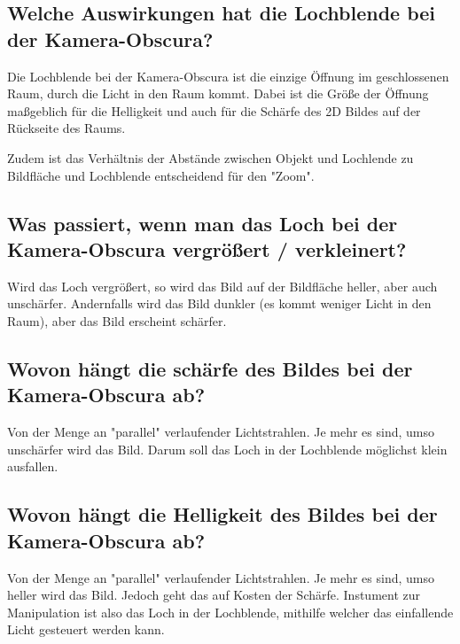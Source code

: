 \subsection{Welche Auswirkungen hat die Lochblende bei der Kamera-Obscura?}
Die Lochblende bei der Kamera-Obscura ist die einzige Öffnung im geschlossenen Raum, durch die Licht in den Raum kommt. Dabei ist die 
Größe der Öffnung maßgeblich für die Helligkeit und auch für die Schärfe des 2D Bildes auf der Rückseite des Raums.


\noindent
Zudem ist das Verhältnis der Abstände zwischen Objekt und Lochlende zu Bildfläche und Lochblende entscheidend für den "Zoom".\\ 


\subsection{Was passiert, wenn man das Loch bei der Kamera-Obscura vergrößert / verkleinert?}
Wird das Loch vergrößert, so wird das Bild auf der Bildfläche heller, aber auch unschärfer. Andernfalls wird das Bild dunkler 
(es kommt weniger Licht in den Raum), aber das Bild erscheint schärfer.

\subsection{Wovon hängt die schärfe des Bildes bei der Kamera-Obscura ab?}
Von der Menge an "parallel" verlaufender Lichtstrahlen. Je mehr es sind, umso unschärfer wird das Bild. Darum soll das Loch in der
Lochblende möglichst klein ausfallen.\\


\subsection{Wovon hängt die Helligkeit des Bildes bei der Kamera-Obscura ab?}
Von der Menge an "parallel" verlaufender Lichtstrahlen. Je mehr es sind, umso heller wird das Bild. Jedoch geht das auf Kosten der 
Schärfe. Instument zur Manipulation ist also das Loch in der Lochblende, mithilfe welcher das einfallende Licht gesteuert werden
kann.\\

